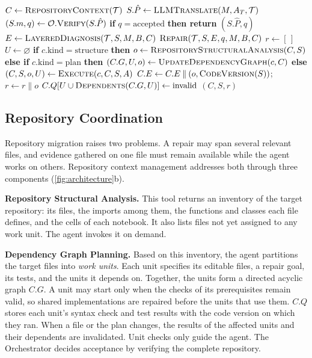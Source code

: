 \vspace{8pt}
\begin{algorithm}[!htb]
\caption{Repository migration and repair coordination}
\label{alg:repository}
\small
\begin{algorithmic}[1]
  \State $C\gets\Call{RepositoryContext}{\mathcal T}$
  \State $S.\hat P\gets\Call{LLMTranslate}{M,A_T,\mathcal T}$
  \State $(S.m,q)\gets\mathcal O.\Call{Verify}{S.\hat P}$ 
  \State \textbf{if} $q=\mathrm{accepted}$ \textbf{then return} $(S.\hat P,q)$
  \State $E\gets\Call{LayeredDiagnosis}{\mathcal T,S,M,B,C}$ 
  \State \Return $\Call{Repair}{\mathcal T,S,E,q,M,B,C}$ 
\EndFunction
{}
  \State $r\gets[\,]$
    \State $U\gets\varnothing$
    \State \textbf{if} $c.\mathrm{kind}=\mathrm{structure}$ \textbf{then} $o\gets\Call{RepositoryStructuralAnalysis}{C,S}$
    \State \textbf{else if} $c.\mathrm{kind}=\mathrm{plan}$ \textbf{then} $(C.G,U,o)\gets\Call{UpdateDependencyGraph}{c,C}$
    \State \textbf{else} $(C,S,o,U)\gets\Call{Execute}{c,C,S,A}$
    \State $C.E\gets C.E\mathbin{\|}(o,\Call{CodeVersion}{S})$; $r\gets r\mathbin{\|}o$
    \State $C.Q[U\cup\Call{Dependents}{C.G,U}]\gets\mathrm{invalid}$
  \EndFor
  \State \Return $(C,S,r)$
\EndFunction
\end{algorithmic}
\end{algorithm}

\subsection{Repository Coordination}
\label{sec:repository-method}
Repository migration raises two problems. A repair may span several relevant files, and evidence gathered on one file must remain available while the agent works on others. Repository context management addresses both through three components (\cref{fig:architecture}b).

\textbf{Repository Structural Analysis.} This tool returns an inventory of the target repository: its files, the imports among them, the functions and classes each file defines, and the cells of each notebook. It also lists files not yet assigned to any work unit. The agent invokes it on demand.

\textbf{Dependency Graph Planning.} Based on this inventory, the agent partitions the target files into \emph{work units}. Each unit specifies its editable files, a repair goal, its tests, and the units it depends on. Together, the units form a directed acyclic graph $C.G$. A unit may start only when the checks of its prerequisites remain valid, so shared implementations are repaired before the units that use them. $C.Q$ stores each unit's syntax check and test results with the code version on which they ran. When a file or the plan changes, the results of the affected units and their dependents are invalidated. Unit checks only guide the agent. The Orchestrator decides acceptance by verifying the complete repository.

